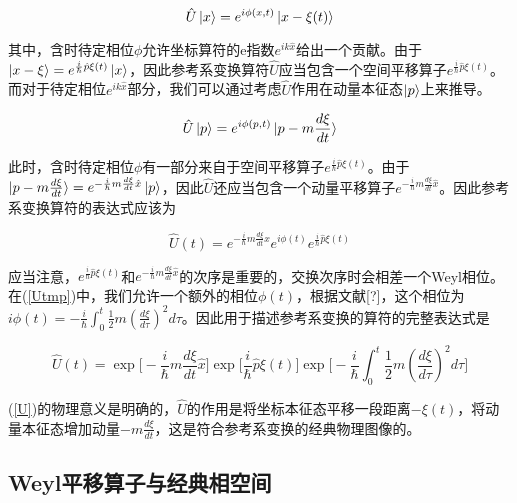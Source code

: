 \documentclass[a4paper]{article}
\begin{document}
        \begin{equation}
            \hat{U}\ket{x}=e^{i\phi(x,t)}\ket{x-\xi(t)}
        \end{equation}

        其中，含时待定相位$\phi$允许坐标算符的e指数$e^{ik\hat{x}}$给出一个贡献。由于$\ket{x-\xi}=e^{\frac{i}{\hbar}\hat{p}\xi(t)}\ket{x}$，因此参考系变换算符$\hat{U}$应当包含一个空间平移算子$e^{\frac{i}{\hbar}\hat{p}\xi(t)}$。而对于待定相位$e^{ik\hat{x}}$部分，我们可以通过考虑$\hat{U}$作用在动量本征态$\ket{p}$上来推导。

        \begin{equation}
            \hat{U}\ket{p}=e^{i\phi(p,t)}\ket{p-m\frac{d\xi}{dt}}
        \end{equation}

        此时，含时待定相位$\phi$有一部分来自于空间平移算子$e^{\frac{i}{\hbar}\hat{p}\xi(t)}$。由于$\ket{p-m\frac{d\xi}{dt}}=e^{-\frac{i}{\hbar}m\frac{d\xi}{dt}\hat{x}}\ket{p}$，因此$\hat{U}$还应当包含一个动量平移算子$e^{-\frac{i}{\hbar}m\frac{d\xi}{dt}\hat{x}}$。因此参考系变换算符的表达式应该为

        \begin{equation}\label{Utmp}
            \hat{U}(t)=e^{-\frac{i}{\hbar}m\frac{d\xi}{dt}\hat{x}}e^{i\phi(t)} e^{\frac{i}{\hbar}\hat{p}\xi(t)}
        \end{equation}

        应当注意，$e^{\frac{i}{\hbar}\hat{p}\xi(t)}$和$e^{-\frac{i}{\hbar}m\frac{d\xi}{dt}\hat{x}}$的次序是重要的，交换次序时会相差一个Weyl相位。在(\ref{Utmp})中，我们允许一个额外的相位$\phi(t)$，根据文献[?]，这个相位为$i\phi(t)=-\frac{i}{\hbar}\int_0^t\frac{1}{2}m(\frac{d \xi}{d\tau})^2 d\tau$。因此用于描述参考系变换的算符的完整表达式是

        \begin{equation}\label{U}
            \hat{U}(t) = \exp\biggl[-\frac{i}{\hbar}m\frac{d\xi}{dt}\hat{x}\biggr] \exp\biggl[\frac{i}{\hbar}\hat{p}\xi(t)\biggr] \exp\biggl[-\frac{i}{\hbar}\int_0^t\frac{1}{2}m(\frac{d \xi}{d\tau})^2 d\tau\biggr]
        \end{equation}

        (\ref{U})的物理意义是明确的，$\hat{U}$的作用是将坐标本征态平移一段距离$-\xi(t)$，将动量本征态增加动量$-m\frac{d \xi}{dt}$，这是符合参考系变换的经典物理图像的。

    \subsection{Weyl平移算子与经典相空间}
\end{document}
